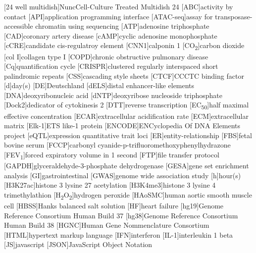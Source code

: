 \begin{acronym}[PDGF-BB]
[24 well multidish]{Nunc\texttrademark Cell-Culture Treated Multidish 24}
[ABC]{activity by contact}
[API]{application programming interface}
[ATAC-seq]{assay for transposase-accessible chromatin using sequencing}
[ATP]{adenosine triphosphate}
[CAD]{coronary artery disease}
[cAMP]{cyclic adenosine monophosphate}
[cCRE]{candidate cis-regulatroy element}
[CNN1]{calponin 1}
[CO\textsubscript{2}]{carbon dioxide}
[col I]{collagen type I}
[COPD]{chronic obstructive pulmonary disease}
[Cq]{quantification cycle}
[CRISPR]{clustered regularly interspaced short palindromic repeats}
[CSS]{cascading style sheets}
[CTCF]{CCCTC binding factor}
[d]{day(s)}
[DE]{Deutschland}
[dELS]{distal enhancer-like elements}
[DNA]{deoxyribonucleic acid}
[dNTP]{deoxyribose nucleoside triphosphate}
[Dock2]{dedicator of cytokinesis 2}
[DTT]{reverse transcription}
[EC\textsubscript{50}]{half maximal effective concentration}
[ECAR]{extracellular acidification rate}
[ECM]{extracellular matrix}
[Elk-1]{ETS like-1 protein}
[ENCODE]{ENCyclopedia Of DNA Elements project}
[eQTL]{expression quantitative trait loci}
[ER]{entity-relationship}
[FBS]{fetal bovine serum}
[FCCP]{carbonyl cyanide-p-trifluoromethoxyphenylhydrazone}
[FEV\textsubscript{1}]{forced expiratory volume in 1 second}
[FTP]{file transfer protocol}
[GAPDH]{glyceraldehyde-3-phosphate dehydrogenase}
[GESA]{gene set enrichment analysis}
[GI]{gastrointestinal}
[GWAS]{genome wide association study}
[h]{hour(s)}
[H3K27ac]{histone 3 lysine 27 acetylation}
[H3K4me3]{histone 3 lysine 4 trimethylathion}
[H\textsubscript{2}O\textsubscript{2}]{hydrogen peroxide}
[HAoSMC]{human aortic smooth muscle cell}
[HBSS]{Hanks balanced salt solution}
[HF]{heart failure}
[hg19]{Genome Reference Consortium Human Build 37}
[hg38]{Genome Reference Consortium Human Build 38}
[HGNC]{Human Gene Nommenclature Consortium}
[HTML]{hypertext markup language}
[IFN]{interferon}
[IL-1\beta]{interleukin 1 beta}
[JS]{javascript}
[JSON]{JavaScript Object Notation}

\end{acronym}
